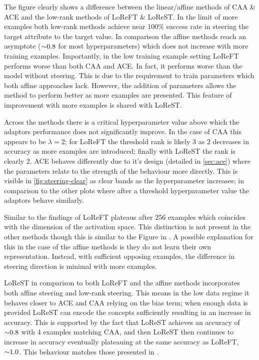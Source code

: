 The figure clearly shows a difference between the linear/affine methods of CAA \& ACE and the low-rank methods of LoReFT \& LoReST.
In the limit of more examples both low-rank methods achieve near 100\% success rate in steering the target attribute to the target value.
In comparison the affine methods reach an asymptote (${\footnotesize \sim} 0.8$ for most hyperparameters) which does not increase with more training examples.
Importantly, in the low training example setting LoReFT performs worse than both CAA and ACE.
In fact, it performs worse than the model without steering.
This is due to the requirement to train parameters which both affine approaches lack.
However, the addition of parameters allows the method to perform better as more examples are presented.
This feature of improvement with more examples is shared with LoReST.

Across the methods there is a critical hyperparameter value above which the adaptors performance does not significantly improve.
In the case of CAA this appears to be $\lambda=2$; for LoReFT the threshold rank is likely 3 as 2 decreases in accuracy as more examples are introduced; finally with LoReST the rank is clearly 2.
ACE behaves differently due to it's design (detailed in \cref{sec:ace}) where the parameters relate to the strength of the behaviour more directly.
This is visible in \cref{fig:steering-clear} as clear bands as the hyperparameter increases; in comparison to the other plots where after a threshold hyperparameter value the adaptors behave similarly.

Similar to the findings of \citet{steering-clear} LoReFT plateaus after 256 examples which coincides with the dimension of the activation space.
This distinction is not present in the other methods though this is similar to the Figure in \citet{steering-clear}.
A possible explanation for this in the case of the affine methods is they do not learn their own representation.
Instead, with sufficient opposing examples, the difference in steering direction is minimal with more examples.

LoReST in comparison to both LoReFT and the affine methods incorporates both affine steering and low-rank steering.
This means in the low data regime it behaves closer to ACE and CAA relying on the bias term; when enough data is provided LoReST can encode the concepts sufficiently resulting in an increase in accuracy.
This is supported by the fact that LoReST achieves an accuracy of ${\footnotesize \sim} 0.8$ with 4 examples matching CAA, and then LoReST then continues to increase in accuracy eventually plateauing at the same accuracy as LoReFT, ${\footnotesize \sim} 1.0$.
This behaviour matches those presented in \citet{steering-clear}.

